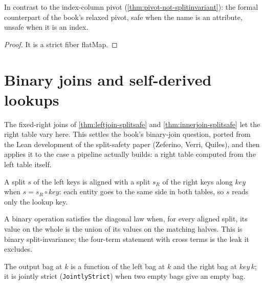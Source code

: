 \begin{theorem}
  \label{thm:pivotattr-splitsafe}\leanok
  In contrast to the index-column pivot
  (\ref{thm:pivot-not-splitinvariant}): the formal counterpart of the
  book's relaxed pivot, safe when the name is an attribute, unsafe when
  it is an index.
\end{theorem}
\begin{proof}\leanok
  It is a strict fiber flatMap.
\end{proof}

\section{Binary joins and self-derived lookups}

The fixed-right joins of \ref{thm:leftjoin-splitsafe} and
\ref{thm:innerjoin-splitsafe} let the right table vary here.  This settles
the book's binary-join question, ported from the Lean development of the
split-safety paper (Zeferino, Verri, Quiles), and then applies it to the
case a pipeline actually builds: a right table computed from the left
table itself.

\begin{definition}
  \label{def:aligned}\leanok
  A split $s$ of the left keys is aligned with a split $s_R$ of the right
  keys along $\mathit{key}$ when $s = s_R \circ \mathit{key}$: each entity
  goes to the same side in both tables, so $s$ reads only the lookup key.
\end{definition}

\begin{definition}
  \label{def:aligned-diagonal}\leanok
  A binary operation satisfies the diagonal law when, for every aligned
  split, its value on the whole is the union of its values on the
  matching halves.  This is binary split-invariance; the four-term
  statement with cross terms is the leak it excludes.
\end{definition}

\begin{definition}
  \label{def:bifibermap}\leanok
  The output bag at $k$ is a function of the left bag at $k$ and the
  right bag at $\mathit{key}\,k$; it is jointly strict
  (\texttt{JointlyStrict}) when two empty bags give an empty bag.
\end{definition}

